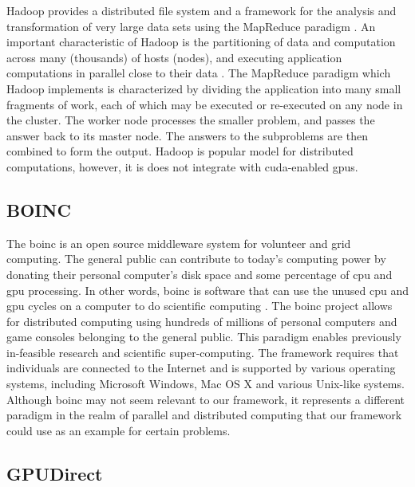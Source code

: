 Hadoop provides a distributed file system and a framework
for the analysis and transformation of very large data sets using the MapReduce
paradigm \cite{website:Apache-Hadoop} \cite{website:Apress} \cite{dias2011hpc}
\cite{dean2001mapreduce}. An important characteristic of Hadoop is the
partitioning of data and computation across many (thousands) of hosts (nodes),
and executing application computations in parallel close to their data
\cite{shvachko2011apache}. The MapReduce \cite{luo2011hierarchical}
\cite{website:Hadoop-Wiki-map} paradigm which Hadoop implements is
characterized by dividing the application into many small fragments of work,
each of which may be executed or re-executed on any node in the cluster. The
worker node processes the smaller problem, and passes the answer back to its
master node. The answers to the subproblems are then combined to form the
output. Hadoop is popular model for distributed computations, however, it is
does not integrate with \gls{cuda}-enabled \glspl{gpu}.

\subsection{BOINC}

The \Gls{boinc} is an open source middleware system for volunteer and grid
computing. The general public can contribute to today's computing power by
donating their personal computer's disk space and some percentage of \gls{cpu}
and \gls{gpu} processing. In other words, \gls{boinc} is software that can use
the unused \gls{cpu} and \gls{gpu} cycles on a computer to do scientific
computing \cite{anderson2004boinc}. The \gls{boinc} project allows for
distributed computing using hundreds of millions of personal computers and game
consoles belonging to the general public. This paradigm enables previously
in-feasible research and scientific super-computing. The framework requires
that individuals are connected to the Internet and is supported by various
operating systems, including Microsoft Windows, Mac OS X and various Unix-like
systems. Although \Gls{boinc} may not seem relevant to our framework, it
represents a different paradigm in the realm of parallel and distributed
computing that our framework could use as an example for certain problems.

\subsection{GPUDirect}

